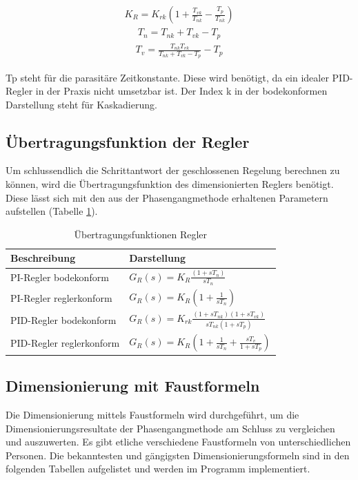 \begin{align}
K_R=K_{rk}\left(1+\frac{T_{vk}}{T_{nk}}-\frac{T_p}{T_{nk}}\right)
\label{krherl}
\end{align}
\begin{align}
T_n=T_{nk}+T_{vk}-T_p
\label{tnherl}
\end{align}
\begin{align}
T_v=\frac{T_{nk}T_{vk}}{T_{nk}+T_{vk}-T_p}-T_p
\label{tvherl}
\end{align}\newline

Tp steht für die parasitäre Zeitkonstante. Diese wird benötigt, da ein idealer PID-Regler in der Praxis nicht umsetzbar ist. Der Index k in der bodekonformen Darstellung steht für Kaskadierung.

\subsection{Übertragungsfunktion der Regler}
Um schlussendlich die Schrittantwort der geschlossenen Regelung berechnen zu können, wird die Übertragungsfunktion des dimensionierten Reglers benötigt. Diese lässt sich mit den aus der Phasengangmethode erhaltenen Parametern aufstellen (Tabelle \ref{ufunkregler}).\newline
\begin{table}
\centering
\renewcommand*{\arraystretch}{1.7}
\begin{tabular}{|l|l|}
\hline 
\textbf{Beschreibung} & \textbf{Darstellung} \\ 
\hline
PI-Regler bodekonform & $G_R(s)=K_R\frac{(1+sT_n)}{sT_n}$ \\ 
\hline 
PI-Regler reglerkonform & $G_R(s)=K_R\left(1+\frac{1}{sT_n}\right)$ \\ 
\hline 
PID-Regler bodekonform & $G_R(s)=K_{rk}\frac{(1+sT_{nk})(1+sT_{vk})}{sT_{nk}(1+sT_p)}$ \\ 
\hline 
PID-Regler reglerkonform & $G_R(s)=K_R\left(1+\frac{1}{sT_n}+\frac{sT_v}{1+sT_p}\right)$ \\ 
\hline 
\end{tabular} 
\renewcommand*{\arraystretch}{1}
\caption{Übertragungsfunktionen Regler}
\label{ufunkregler}
\end{table}

\newpage
\subsection{Dimensionierung mit Faustformeln}
Die Dimensionierung mittels Faustformeln wird durchgeführt, um die Dimensionierungsresultate der Phasengangmethode am Schluss zu vergleichen und auszuwerten. Es gibt etliche verschiedene Faustformeln von unterschiedlichen Personen. Die bekanntesten und gängigsten Dimensionierungsformeln sind in den folgenden Tabellen aufgelistet und werden im Programm implementiert.\\

